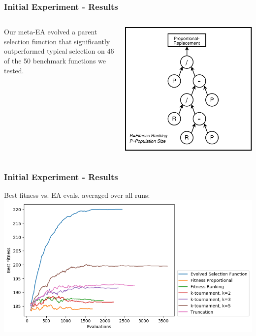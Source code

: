 \documentclass{beamer}
\begin{document}
	\begin{frame}
		\frametitle{Initial Experiment - Results}
		\begin{columns}
		\begin{column}{0.4\textwidth}
			Our meta-EA evolved a parent selection function that significantly outperformed typical selection on 46 of the 50 benchmark functions we tested.
		\end{column}
		\begin{column}{0.6\textwidth}
			\includegraphics[width=\textwidth]{initialExperimentResult}
		\end{column}
		\end{columns}
	\end{frame}

	\begin{frame}
		\centering
		\frametitle{Initial Experiment - Results}
		Best fitness vs. EA evals, averaged over all runs:
		\includegraphics[width=\textwidth]{nk_landscape_fitness_plot}
	\end{frame}	
	
\end{document}
